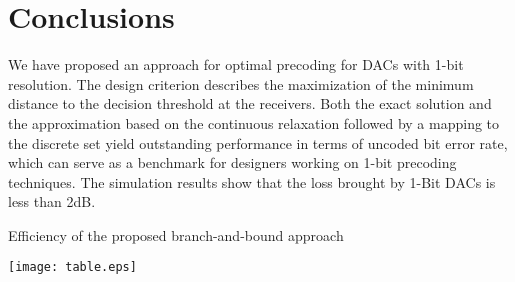 \documentclass[journal,comsoc]{IEEEtran}
\begin{document}
\section{Conclusions}
We have proposed an approach for optimal precoding for DACs with 1-bit resolution.
The design criterion describes the maximization of the minimum distance to the decision threshold at the receivers. Both the exact solution and the approximation based on the continuous relaxation followed by a mapping to the discrete set yield outstanding performance in terms of uncoded bit error rate, which can serve as a benchmark for designers working on 1-bit precoding techniques. The simulation results show that the loss brought by 1-Bit DACs is less than \si{2}{dB}.
\begin{table}
 \vspace{0pt}
\begin{center}
\captionsetup{justification=centering,font=scriptsize}
\caption{Efficiency of the proposed branch-and-bound approach}
\vspace{-0.5em}
\texttt{[image: table.eps]}
			\label{tab:efficiency}
		\end{center}
		\vspace{-2em}
		\end{table}


%
%

\end{document}
